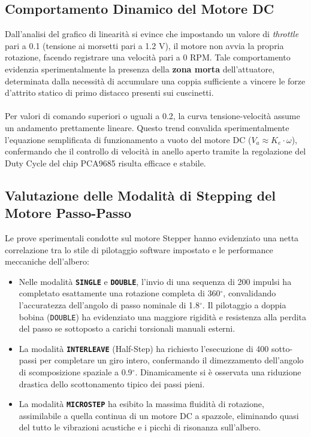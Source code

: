 \documentclass{article}
\begin{document}
\subsection{Comportamento Dinamico del Motore DC}
Dall'analisi del grafico di linearità si evince che impostando un valore di \textit{throttle} pari a 0.1 (tensione ai morsetti pari a 1.2 V), il motore non avvia la propria rotazione, facendo registrare una velocità pari a 0 RPM. Tale comportamento evidenzia sperimentalmente la presenza della \textbf{zona morta} dell'attuatore, determinata dalla necessità di accumulare una coppia sufficiente a vincere le forze d'attrito statico di primo distacco presenti sui cuscinetti. 
\\ \\
\noindent Per valori di comando superiori o uguali a 0.2, la curva tensione-velocità assume un andamento prettamente lineare. Questo trend convalida sperimentalmente l'equazione semplificata di funzionamento a vuoto del motore DC ($V_a \approx K_e \cdot \omega$), confermando che il controllo di velocità in anello aperto tramite la regolazione del Duty Cycle del chip PCA9685 risulta efficace e stabile.

\subsection{Valutazione delle Modalità di Stepping del Motore Passo-Passo}
Le prove sperimentali condotte sul motore Stepper hanno evidenziato una netta correlazione tra lo stile di pilotaggio software impostato e le performance meccaniche dell'albero:

\begin{itemize}
  \item Nelle modalità \textbf{\texttt{SINGLE}} e \textbf{\texttt{DOUBLE}}, l'invio di una sequenza di 200 impulsi ha completato esattamente una rotazione completa di 360$^{\circ}$, convalidando l'accuratezza dell'angolo di passo nominale di 1.8$^{\circ}$. Il pilotaggio a doppia bobina (\texttt{DOUBLE}) ha evidenziato una maggiore rigidità e resistenza alla perdita del passo se sottoposto a carichi torsionali manuali esterni.
  \item La modalità \textbf{\texttt{INTERLEAVE}} (Half-Step) ha richiesto l'esecuzione di 400 sotto-passi per completare un giro intero, confermando il dimezzamento dell'angolo di scomposizione spaziale a 0.9$^{\circ}$. Dinamicamente si è osservata una riduzione drastica dello scottonamento tipico dei passi pieni.
  \item La modalità \textbf{\texttt{MICROSTEP}} ha esibito la massima fluidità di rotazione, assimilabile a quella continua di un motore DC a spazzole, eliminando quasi del tutto le vibrazioni acustiche e i picchi di risonanza sull'albero.
\end{itemize}
\end{document}
